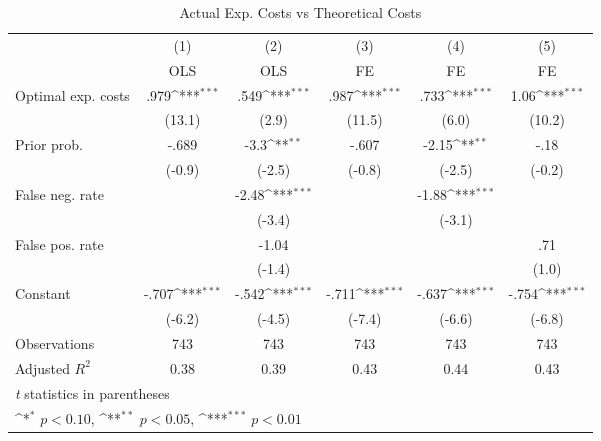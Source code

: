 \begin{table}[htbp]\centering
\def\sym#1{\ifmmode^{#1}\else\(^{#1}\)\fi}
\caption{Actual Exp. Costs vs Theoretical Costs}
\begin{tabular}{l*{5}{c}}
\hline\hline
                &\multicolumn{1}{c}{(1)}&\multicolumn{1}{c}{(2)}&\multicolumn{1}{c}{(3)}&\multicolumn{1}{c}{(4)}&\multicolumn{1}{c}{(5)}\\
                &\multicolumn{1}{c}{OLS}&\multicolumn{1}{c}{OLS}&\multicolumn{1}{c}{FE}&\multicolumn{1}{c}{FE}&\multicolumn{1}{c}{FE}\\
\hline
Optimal exp. costs&     .979\sym{***}&     .549\sym{***}&     .987\sym{***}&     .733\sym{***}&     1.06\sym{***}\\
                &   (13.1)         &    (2.9)         &   (11.5)         &    (6.0)         &   (10.2)         \\
Prior prob.     &    -.689         &     -3.3\sym{**} &    -.607         &    -2.15\sym{**} &     -.18         \\
                &   (-0.9)         &   (-2.5)         &   (-0.8)         &   (-2.5)         &   (-0.2)         \\
False neg. rate &                  &    -2.48\sym{***}&                  &    -1.88\sym{***}&                  \\
                &                  &   (-3.4)         &                  &   (-3.1)         &                  \\
False pos. rate &                  &    -1.04         &                  &                  &      .71         \\
                &                  &   (-1.4)         &                  &                  &    (1.0)         \\
Constant        &    -.707\sym{***}&    -.542\sym{***}&    -.711\sym{***}&    -.637\sym{***}&    -.754\sym{***}\\
                &   (-6.2)         &   (-4.5)         &   (-7.4)         &   (-6.6)         &   (-6.8)         \\
\hline
Observations    &      743         &      743         &      743         &      743         &      743         \\
Adjusted \(R^{2}\)&     0.38         &     0.39         &     0.43         &     0.44         &     0.43         \\
\hline\hline
\multicolumn{6}{l}{\footnotesize \textit{t} statistics in parentheses}\\
\multicolumn{6}{l}{\footnotesize \sym{*} \(p<0.10\), \sym{**} \(p<0.05\), \sym{***} \(p<0.01\)}\\
\end{tabular}
\end{table}
